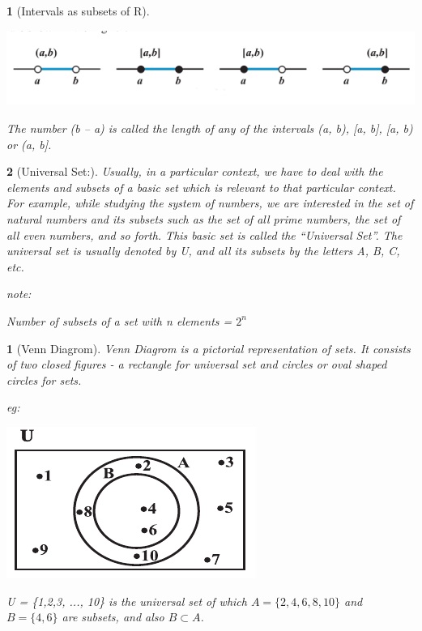 \documentclass[12pt]{article}
\theoremstyle{colored}
\newtheorem*{defn}{}
\theoremstyle{subcolored}
\newtheorem*{subdefn}{}
\begin{document}
\begin{multicols}{2}
\begin{subdefn}[Intervals as subsets of R]
\begin{center}
    \includegraphics[scale=0.4]{set1.png}
\end{center}
The number (b – a) is called the length of any of the intervals (a, b), [a, b],
[a, b) or (a, b].
\end{subdefn}
\begin{subdefn}[Universal Set:]
    Usually, in a particular context, we have to deal with the elements and subsets of a
basic set which is relevant to that particular context. For example, while studying the
system of numbers, we are interested in the set of natural numbers and its subsets such
as the set of all prime numbers, the set of all even numbers, and so forth. This basic set
is called the “Universal Set”. The universal set is usually denoted by U, and all its
subsets by the letters A, B, C, etc.


note:

Number of subsets of a set with n elements = $2^n$
\end{subdefn}

\begin{defn}[\large Venn Diagrom]
    \hfill \break
    Venn Diagrom is a pictorial representation of sets. It consists of two closed figures - a rectangle for universal set and circles or
oval shaped circles for sets.

eg: 

\begin{center}
    \includegraphics[scale=0.4]{set2.png}
\end{center}

U = \{1,2,3, ..., 10\} is the
universal set of which $A = \{2,4,6,8,10\}$ and $B = \{4, 6\}$ are subsets,
and also $B \subset A$.
    
\end{defn}


\end{multicols}
\end{document}
